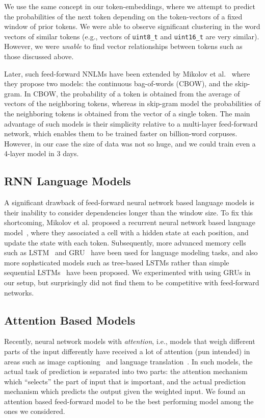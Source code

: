 We use the same concept in our token-embeddings, where we attempt to predict the
probabilities of the next token depending on the token-vectors of a fixed window
of prior tokens. We were able to observe significant clustering in the word
vectors of similar tokens (e.g., vectors of {\tt uint8\_t} and {\tt uint16\_t}
are very similar). However, we were {\it unable} to find vector relationships
between tokens such as those discussed above.

Later, such feed-forward NNLMs have been extended by Mikolov et
al.~\cite{ref:mikolov:wvec} where they propose two models: the continuous
bag-of-words (CBOW), and the skip-gram. In CBOW, the probability of a token is
obtained from the average of vectors of the neighboring tokens, whereas in
skip-gram model the probabilities of the neighboring tokens is obtained from the
vector of a single token. The main advantage of such models is their simplicity
relative to a multi-layer feed-forward network, which enables them to be trained
faster on billion-word corpuses. However, in our case the size of data was not
so huge, and we could train even a 4-layer model in 3 days.

\subsection{RNN Language Models}
\label{sec:rnnlm}
A significant drawback of feed-forward neural network based language models is
their inability to consider dependencies longer than the window size. To fix
this shortcoming, Mikolov et al. proposed a recurrent neural network based
language model~\cite{ref:rnnlm}, where they associated a cell with a hidden state
at each position, and update the state with each token. Subsequently, more
advanced memory cells such as LSTM~\cite{ref:lstm} and GRU~\cite{ref:gru} have
been used for language modeling tasks, and also more sophsticated models such as
tree-based LSTMs rather than simple sequential LSTMs~\cite{ref:treelstm} have
been proposed. We experimented with using GRUs in our setup, but surprisingly
did not find them to be competitive with feed-forward networks.

\subsection{Attention Based Models}
\label{sec:attn}
Recently, neural network models with {\it attention}, i.e., models that weigh
different parts of the input differently have received a lot of attention (pun
intended) in areas such as image captioning~\cite{ref:showattendtell} and
language translation~\cite{ref:nmt,ref:nmt2}. In such models, the actual task of
prediction is separated into two parts: the attention mechanism which
``selects'' the part of input that is important, and the actual prediction
mechanism which predicts the output given the weighted input. We found an
attention based feed-forward model to be the best performing model among the
ones we considered.
